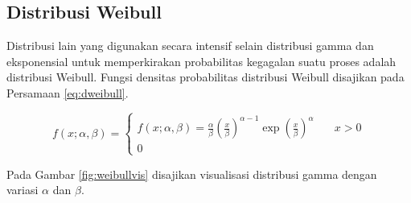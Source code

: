 \documentclass[]{book}
\begin{document}
\subsection{Distribusi Weibull}\label{distribusi-weibull}

Distribusi lain yang digunakan secara intensif selain distribusi gamma
dan eksponensial untuk memperkirakan probabilitas kegagalan suatu proses
adalah distribusi Weibull. Fungsi densitas probabilitas distribusi
Weibull disajikan pada Persamaan \eqref{eq:dweibull}.

\begin{equation}
f\left(x;\alpha,\beta \right) =
  \begin{cases}
    f\left(x;\alpha,\beta\right)=\frac{\alpha}{\beta}\left(\frac{x}{\beta}\right)^{\alpha-1}\exp\left(\frac{x}{\beta}\right)^{\alpha}     & \quad x>0\\
    0                   & \quad\text{}
    \end{cases}
 \label{eq:dweibull}
\end{equation}

Pada Gambar \ref{fig:weibullvis} disajikan visualisasi distribusi gamma
dengan variasi \(\alpha\) dan \(\beta\).
\end{document}
